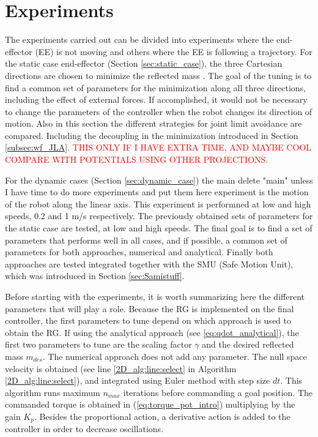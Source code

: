 \chapter{Experiments}
\label{ch:experiments}





The experiments carried out can be divided into experiments where the end-effector (EE) is not moving  and others where the EE is following a trajectory. 
For the static case end-effector (Section \ref{sec:static_case}), the three Cartesian directions are chosen to minimize the reflected mass . The goal of the tuning is to find a common set of parameters for the minimization along all three directions, including the effect of external forces. If accomplished, it would not be necessary to change the parameters of the controller when the robot changes its direction of motion.
Also in this section the different strategies for joint limit avoidance are compared. Including the decoupling in the minimization  introduced in Section \ref{subsec:wf_JLA}. \textcolor{red}{THIS ONLY IF I HAVE EXTRA TIME, AND MAYBE COOL COMPARE WITH POTENTIALS USING OTHER PROJECTIONS.}



For the dynamic cases (Section \ref{sec:dynamic_case}) the main {\color{red} delete "main" unless I have time to do more experiments and put them here}  experiment is the motion of the robot along the linear axis. This experiment is performned at low and high speeds, 0.2 and 1 m/s respectively. 
The previously obtained sets of parameters for the static case are tested, at low and high speeds. The final goal is to find a set of parameters that performs well in all cases, and if possible, a common set of parameters for both approaches, numerical and analytical.
Finally both approaches are tested integrated together with the SMU (Safe Motion Unit), which was introduced in Section \ref{sec:Samistuff}. 

Before starting with the experiments, it is worth summarizing here the different parameters that will play a role. 
Because the RG is implemented on the final controller, the first parameters to tune depend on which approach is used to obtain the RG. If using the analytical approach (see \ref{eq:qdot_analytical}), the first two parameters to tune are the scaling factor $\gamma$ and the desired reflected mass $m_{des}$. The numerical approach does not add any parameter. The null space velocity is obtained (see line \ref{2D_alg:line:select} in Algorithm \ref{2D_alg:line:select}), and integrated using Euler method with step size $dt$. This algorithm runs maximum $n_{max}$ iterations before commanding a goal position. The commanded torque is obtained in (\ref{eq:torque_pot_intro}) multiplying by the gain $K_p$. Besides the proportional action, a derivative action is added to the controller in order to decrease oscillations.



